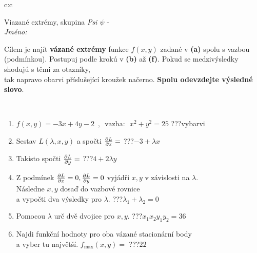 \documentclass[10pt]{report}
\begin{document}
\begin{tabular}{c:c}
\begin{minipage}[c][104.5mm][t]{0.5\linewidth}
\begin{center}
\vspace{7mm}
{\huge Viazané extrémy, skupina \textit{Psi $\psi$} -}\\[5mm]
\textit{Jméno:}\phantom{xxxxxxxxxxxxxxxxxxxxxxxxxxxxxxxxxxxxxxxxxxxxxxxxxxxxxxxxxxxxxxxxx}\\[5mm]
\begin{minipage}{0.95\linewidth}
\begin{center}
Cílem je najít \textbf{vázané extrémy} funkce $f(x,y)$ zadané v \textbf{(a)} spolu s vazbou (podmínkou). Postupuj podle krokú v \textbf{(b)} až \textbf{(f)}. Pokud se medzivýsledky shodujú s těmi za otazníky,\\tak napravo obarvi příslušející kroužek načerno. \textbf{Spolu odevzdejte výsledné slovo}.
\end{center}
\end{minipage}
\\[1mm]
\begin{minipage}{0.79\linewidth}
\begin{center}
\begin{varwidth}{\linewidth}
\begin{enumerate}
\normalsize
\item $f(x,y)=-3x+4y-2 \enspace , \enspace \mathrm{vazba:} \enspace x^2+y^2=25$\quad \dotfill\; ???\;\dotfill \quad vybarvi
\item Sestav $L(\lambda,x,y)$ a spočti $\pdv{L}{x}=$\quad \dotfill\; ???\;\dotfill \quad $-3+\lambda x$
\item Takisto spočti $\pdv{L}{y}=$\quad \dotfill\; ???\;\dotfill \quad $4+2\lambda y$
\item Z podmínek $\pdv{L}{x}=0 , \pdv{L}{y}=0$ vyjádři $x,y$ v závislosti na $\lambda$.\\ \phantom{xxxxxx}Následne $x,y$ dosaď do vazbové rovnice\\ \phantom{xxxxxx}a vypočti dva výsledky pro $\lambda$.\quad \dotfill\; ???\;\dotfill \quad $\lambda_1+\lambda_2=0$
\item Pomocou $\lambda$ urč dvě dvojice pro $x,y$.\quad \dotfill\; ???\;\dotfill \quad $x_1 x_2 y_1 y_2=36$
\item Najdi funkční hodnoty pro oba vázané stacionární body\\ \phantom{xxxxxx}a vyber tu najvětší. $f_{\text{max}}(x,y)=$\quad \dotfill\; ???\;\dotfill \quad $22$

\end{enumerate}
\end{varwidth}
\end{center}
\end{minipage}
\end{center}
\end{minipage}
\end{tabular}
\end{document}

